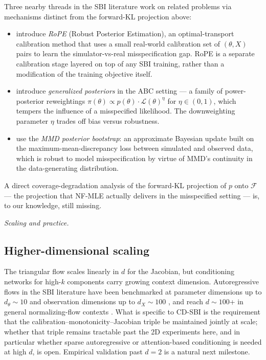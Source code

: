 \documentclass[11pt]{article}
\providecommand{\tightlist}{\setlength{\itemsep}{0pt}\setlength{\parskip}{0pt}}
\begin{document}
Three nearby threads in the SBI literature work on related problems
via mechanisms distinct from the forward-KL projection above:
\begin{itemize}
\tightlist
\item
  \citet{WehenkelEtAl2025} introduce \emph{RoPE} (Robust Posterior
  Estimation), an optimal-transport calibration method that uses a
  small real-world calibration set of \((\theta, X)\) pairs to learn
  the simulator-vs-real misspecification gap. RoPE is a separate
  calibration stage layered on top of any SBI training, rather than a
  modification of the training objective itself.
\item
  \citet{SchmonEtAl2020} introduce \emph{generalized posteriors} in the
  ABC setting --- a family of power-posterior reweightings
  \(\pi(\theta) \propto p(\theta) \cdot \mathcal{L}(\theta)^\eta\) for
  \(\eta \in (0, 1)\), which tempers the influence of a misspecified
  likelihood. The downweighting parameter \(\eta\) trades off bias
  versus robustness.
\item
  \citet{DellaportaEtAl2022} use the \emph{MMD posterior bootstrap}: an
  approximate Bayesian update built on the maximum-mean-discrepancy
  loss between simulated and observed data, which is robust to model
  misspecification by virtue of MMD's continuity in the data-generating
  distribution.
\end{itemize}
A direct coverage-degradation analysis of the forward-KL projection of
\(p\) onto \(\mathcal{F}\) --- the projection that NF-MLE actually
delivers in the misspecified setting --- is, to our knowledge, still
missing.

\medskip
\noindent\textit{Scaling and practice.}
\medskip

\subsection{Higher-dimensional scaling}\label{subsec:11.5}
The triangular flow scales linearly in \(d\) for the Jacobian, but
conditioning networks for high-\(k\) components carry growing context
dimension. Autoregressive flows in the SBI literature have been benchmarked at
parameter dimensions up to \(d_\theta \sim 10\) and observation
dimensions up to \(d_X \sim 100\) \citep{LueckmannEtAl2021}, and reach
\(d \sim 100\)+ in general normalizing-flow contexts
\citep{PapamakariosEtAl2017, DurkanEtAl2019}. What is specific to CD-SBI
is the requirement
that the calibration--monotonicity--Jacobian triple be maintained
jointly at scale; whether that triple remains tractable past the 2D
experiments here, and in particular whether sparse autoregressive or
attention-based conditioning is needed at high \(d\), is open.
Empirical validation past \(d = 2\) is a natural next milestone.
\end{document}
